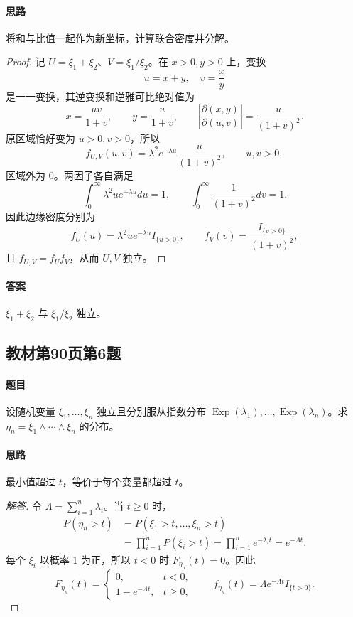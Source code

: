 \paragraph{思路}将和与比值一起作为新坐标，计算联合密度并分解。
\begin{proof}
记 $U=\xi_1+\xi_2$、$V=\xi_1/\xi_2$。在 $x>0,y>0$ 上，变换
\[
u=x+y,\quad v=\frac xy
\]
是一一变换，其逆变换和逆雅可比绝对值为
\[
x=\frac{uv}{1+v},\qquad y=\frac{u}{1+v},\qquad
\left|\frac{\partial(x,y)}{\partial(u,v)}\right|=\frac{u}{(1+v)^2}.
\]
原区域恰好变为 $u>0,v>0$，所以
\[
f_{U,V}(u,v)=\lambda^2e^{-\lambda u}\frac{u}{(1+v)^2},\qquad u,v>0,
\]
区域外为 $0$。两因子各自满足
\[
\int_0^\infty\lambda^2ue^{-\lambda u}du=1,\qquad
\int_0^\infty\frac1{(1+v)^2}dv=1.
\]
因此边缘密度分别为
\[
f_U(u)=\lambda^2ue^{-\lambda u}I_{\{u>0\}},\qquad
f_V(v)=\frac{I_{\{v>0\}}}{(1+v)^2},
\]
且 $f_{U,V}=f_Uf_V$，从而 $U,V$ 独立。
\end{proof}
\paragraph{答案}$\xi_1+\xi_2$ 与 $\xi_1/\xi_2$ 独立。

\subsection{教材第90页第6题}\label{ex:w12-b90-6}
\paragraph{题目}
设随机变量 $\xi_1,\ldots,\xi_n$ 独立且分别服从指数分布
$\operatorname{Exp}(\lambda_1),\ldots,\operatorname{Exp}(\lambda_n)$。求
$\eta_n=\xi_1\wedge\cdots\wedge\xi_n$ 的分布。
\paragraph{思路}最小值超过 $t$，等价于每个变量都超过 $t$。
\begin{proof}[解答]
令 $\Lambda=\sum_{i=1}^n\lambda_i$。当 $t\geq0$ 时，
\begin{align*}
P(\eta_n>t)
&=P(\xi_1>t,\ldots,\xi_n>t)\\
&=\prod_{i=1}^nP(\xi_i>t)
=\prod_{i=1}^ne^{-\lambda_it}=e^{-\Lambda t}.
\end{align*}
每个 $\xi_i$ 以概率 $1$ 为正，所以 $t<0$ 时 $F_{\eta_n}(t)=0$。因此
\[
F_{\eta_n}(t)=\begin{cases}0,&t<0,\\1-e^{-\Lambda t},&t\geq0,\end{cases}
\qquad
f_{\eta_n}(t)=\Lambda e^{-\Lambda t}I_{\{t>0\}}.
\]
\end{proof}
